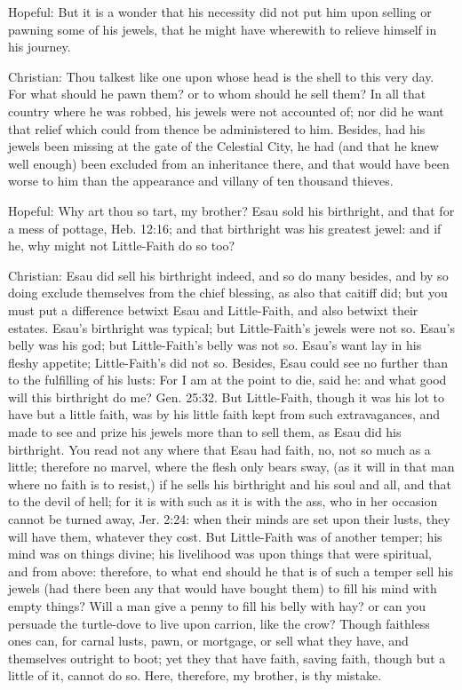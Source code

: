 Hopeful: But it is a wonder that his necessity did not put him upon
selling or pawning some of his jewels, that he might have wherewith to
relieve himself in his journey.

Christian: Thou talkest like one upon whose head is the shell to this
very day. For what should he pawn them? or to whom should he sell them?
In all that country where he was robbed, his jewels were not accounted
of; nor did he want that relief which could from thence be administered
to him. Besides, had his jewels been missing at the gate of the
Celestial City, he had (and that he knew well enough) been excluded
from an inheritance there, and that would have been worse to him than
the appearance and villany of ten thousand thieves.

Hopeful: Why art thou so tart, my brother? Esau sold his birthright,
and that for a mess of pottage, Heb. 12:16; and that birthright was his
greatest jewel: and if he, why might not Little-Faith do so too?

Christian: Esau did sell his birthright indeed, and so do many besides,
and by so doing exclude themselves from the chief blessing, as also
that caitiff did; but you must put a difference betwixt Esau and
Little-Faith, and also betwixt their estates. Esau's birthright was
typical; but Little-Faith's jewels were not so. Esau's belly was his
god; but Little-Faith's belly was not so. Esau's want lay in his fleshy
appetite; Little-Faith's did not so. Besides, Esau could see no further
than to the fulfilling of his lusts: For I am at the point to die, said
he: and what good will this birthright do me? Gen. 25:32. But
Little-Faith, though it was his lot to have but a little faith, was by
his little faith kept from such extravagances, and made to see and
prize his jewels more than to sell them, as Esau did his birthright.
You read not any where that Esau had faith, no, not so much as a
little; therefore no marvel, where the flesh only bears sway, (as it
will in that man where no faith is to resist,) if he sells his
birthright and his soul and all, and that to the devil of hell; for it
is with such as it is with the ass, who in her occasion cannot be
turned away, Jer. 2:24: when their minds are set upon their lusts, they
will have them, whatever they cost. But Little-Faith was of another
temper; his mind was on things divine; his livelihood was upon things
that were spiritual, and from above: therefore, to what end should he
that is of such a temper sell his jewels (had there been any that would
have bought them) to fill his mind with empty things? Will a man give a
penny to fill his belly with hay? or can you persuade the turtle-dove
to live upon carrion, like the crow? Though faithless ones can, for
carnal lusts, pawn, or mortgage, or sell what they have, and themselves
outright to boot; yet they that have faith, saving faith, though but a
little of it, cannot do so. Here, therefore, my brother, is thy
mistake.

